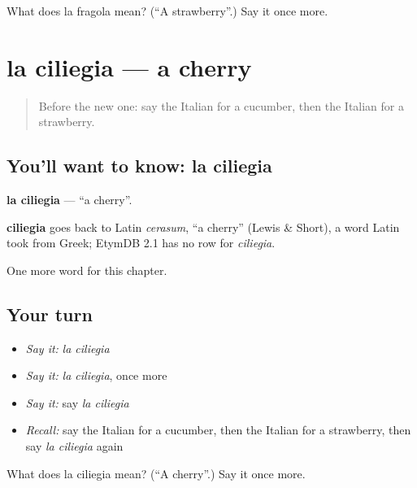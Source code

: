 \begin{tcolorbox}[breakable,colback=teal!4,colframe=teal!35!black,title={Before you move on}]
What does la fragola mean? (\textquotedblleft{}A strawberry\textquotedblright{}.) Say it once more.
\end{tcolorbox}
\section[la ciliegia]{la ciliegia — a cherry}

\label{lesson:IT-C107-ciliegia}



\begin{quote}
Before the new one: say the Italian for a cucumber, then the Italian for a strawberry.
\end{quote}

\subsection*{You'll want to know: la ciliegia}
\textbf{la ciliegia} — \textquotedblleft{}a cherry\textquotedblright{}.

\begin{cousinweb}
\textbf{ciliegia} goes back to Latin \emph{cerasum}, \textquotedblleft{}a cherry\textquotedblright{} (Lewis \& Short), a word Latin took from Greek; EtymDB 2.1 has no row for \emph{ciliegia}.
\end{cousinweb}

\begin{grammarlens}[title={What you've built}]
One more word for this chapter.
\end{grammarlens}

\subsection*{Your turn}
\begin{itemize}
\raggedright
  \item \emph{Say it:} \emph{la ciliegia}
  \item \emph{Say it:} \emph{la ciliegia}, once more
  \item \emph{Say it:} say \emph{la ciliegia}
  \item \emph{Recall:} say the Italian for a cucumber, then the Italian for a strawberry, then say \emph{la ciliegia} again
\end{itemize}

\begin{tcolorbox}[breakable,colback=teal!4,colframe=teal!35!black,title={Before you move on}]
What does la ciliegia mean? (\textquotedblleft{}A cherry\textquotedblright{}.) Say it once more.
\end{tcolorbox}

